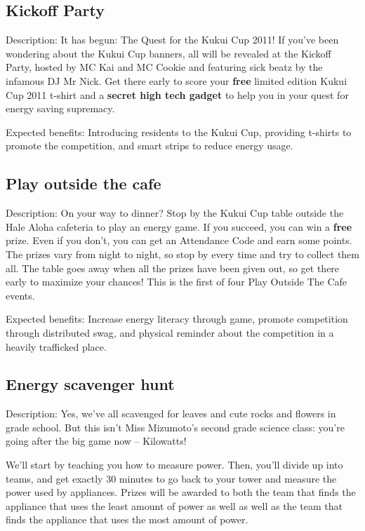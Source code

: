 \subsection{Kickoff Party}

Description: It has begun: The Quest for the Kukui Cup 2011! If you've been wondering about the Kukui Cup banners, all will be revealed at the Kickoff Party, hosted by MC Kai and MC Cookie and featuring sick beatz by the infamous DJ Mr Nick. Get there early to score your \textbf{free} limited edition Kukui Cup 2011 t-shirt and a \textbf{secret high tech gadget} to help you in your quest for energy saving supremacy.

Expected benefits: Introducing residents to the Kukui Cup, providing t-shirts to promote the competition, and smart strips to reduce energy usage.


\subsection{Play outside the cafe}

Description: On your way to dinner? Stop by the Kukui Cup table outside the Hale Aloha cafeteria to play an energy game. If you succeed, you can win a \textbf{free} prize. Even if you don't, you can get an Attendance Code and earn some points. The prizes vary from night to night, so stop by every time and try to collect them all. The table goes away when all the prizes have been given out, so get there early to maximize your chances! This is the first of four Play Outside The Cafe events.

Expected benefits: Increase energy literacy through game, promote competition through distributed swag, and physical reminder about the competition in a heavily trafficked place.


\subsection{Energy scavenger hunt}

Description: Yes, we've all scavenged for leaves and cute rocks and flowers in grade school.  But this isn't Miss Mizumoto's second grade science class: you're going after the big game now -- Kilowatts!

We'll start by teaching you how to measure power. Then, you'll divide up into teams, and get exactly 30 minutes to go back to your tower and measure the power used by appliances. Prizes will be awarded to both the team that finds the appliance that uses the least amount of power as well as well as the team that finds the appliance that uses the most amount of power.

